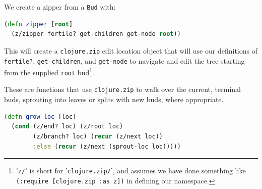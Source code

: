 \documentclass[10pt,openany]{article}
\numberwithin{definition}{section}
\numberwithin{example}{section}
\numberwithin{equation}{section}
\numberwithin{figure}{section}
\begin{document}
We create a zipper from a \texttt{Bud} with:

\begin{minipage}[t]{1\columnwidth}%
\begin{lstlisting}[caption={Create a zipper for growing a tree},label={lis:zipper},language=clojure,tabsize=2]
(defn zipper [root] 
  (z/zipper fertile? get-children get-node root)) 
\end{lstlisting}
%
\end{minipage}

This will create a \texttt{clojure.zip} edit location object that
will use our definitions of \texttt{fertile?}, \texttt{get-children},
and \texttt{get-node} to navigate and edit the tree starting from
the supplied \texttt{root} bud\footnote{'\texttt{z/}' is short for '\texttt{clojure.zip/}', and assumes we
have done something like \texttt{(:require~{[}clojure.zip~:as~z{]})}
in defining our namespace.}. 

These are functions that use \texttt{clojure.zip} to walk over the
current, terminal buds, sprouting into leaves or splits with new buds,
where appropriate.

\begin{minipage}[t]{1\columnwidth}%
\begin{lstlisting}[caption={Growing a tree using a zipper},label={lis:grow-loc},language=clojure,tabsize=2]
(defn grow-loc [loc]
  (cond (z/end? loc) (z/root loc)
        (z/branch? loc) (recur (z/next loc))
        :else (recur (z/next (sprout-loc loc))))) 
\end{lstlisting}
%
\end{minipage}
\end{document}
